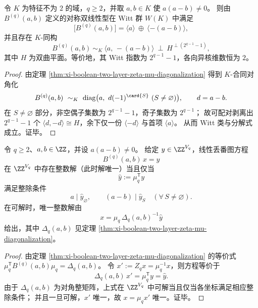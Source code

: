 

\begin{theorem}\label{thm:xi-boolean-two-layer-witt-core}
令 \(K\) 为特征不为 \(2\) 的域，\(q\ge 2\)，并取 \(a,b\in K\) 使 \(a(a-b)\neq 0\)。
则由 \(B^{(q)}(a,b)\) 定义的对称双线性型在 Witt 群 \(W(K)\) 中满足
\[
\bigl[B^{(q)}(a,b)\bigr]=\langle a\rangle\ \oplus\ \langle -(a-b)\rangle,
\]
并且存在 \(K\)-同构
\[
B^{(q)}(a,b)\ \sim_K\ \langle a,\,-(a-b)\rangle\ \perp\ H^{\perp(2^{q-1}-1)},
\]
其中 \(H\) 为双曲平面。等价地，其 Witt 指数为 \(2^{q-1}-1\)，各向异核维数恒为 \(2\)。
\end{theorem}
\begin{proof}
由定理 \ref{thm:xi-boolean-two-layer-zeta-mu-diagonalization} 得到 \(K\)-合同对角化
\[
B^{(q)}(a,b)\ \sim_K\ \operatorname{diag}\bigl(a,\ d(-1)^{\card{S}}\ (S\neq\varnothing)\bigr),
\qquad d=a-b.
\]
在 \(S\neq\varnothing\) 部分，非空偶子集数为 \(2^{q-1}-1\)，奇子集数为 \(2^{q-1}\)；
故可配对剥离出 \(2^{q-1}-1\) 个 \(\langle d,-d\rangle\cong H\)，余下仅一份 \(\langle -d\rangle\) 与首项 \(\langle a\rangle\)。
从而 Witt 类与分解式成立。证毕。
\end{proof}

\begin{theorem}\label{thm:xi-boolean-two-layer-mobius-diophantine-criterion}
令 \(q\ge 2\)、\(a,b\in\ZZ\)，并设 \(a(a-b)\neq 0\)。
给定 \(y\in\ZZ^{V_q}\)，线性丢番图方程
\[
B^{(q)}(a,b)\,x=y
\]
在 \(\ZZ^{V_q}\) 中存在整数解（此时解唯一）当且仅当
\[
\widehat y:=\mu_q^{\mathsf T}y
\]
满足整除条件
\[
a\mid \widehat y_{\varnothing},
\qquad
(a-b)\mid \widehat y_S\quad(\forall\,S\neq\varnothing).
\]
在可解时，唯一整数解由
\[
x=\mu_q\,\Delta_q(a,b)^{-1}\widehat y
\]
给出，其中 \(\Delta_q(a,b)\) 见定理 \ref{thm:xi-boolean-two-layer-zeta-mu-diagonalization}。
\end{theorem}
\begin{proof}
由定理 \ref{thm:xi-boolean-two-layer-zeta-mu-diagonalization} 的等价式
\(\mu_q^{\mathsf T}B^{(q)}(a,b)\mu_q=\Delta_q(a,b)\)。
令 \(x':=Z_qx=\mu_q^{-1}x\)，则方程等价于
\[
\Delta_q(a,b)\,x'=\mu_q^{\mathsf T}y=\widehat y.
\]
由于 \(\Delta_q(a,b)\) 为对角整矩阵，上式在 \(\ZZ^{V_q}\) 中可解当且仅当各坐标满足相应整除条件；
并且一旦可解，\(x'\) 唯一，故 \(x=\mu_qx'\) 唯一。证毕。
\end{proof}

